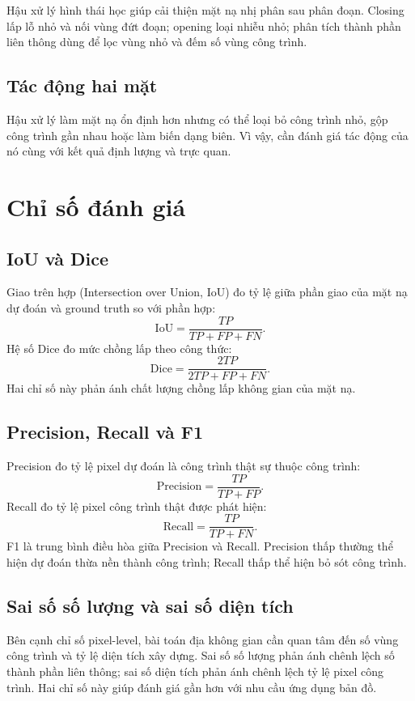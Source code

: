 \documentclass[12pt,a4paper]{report}
\begin{document}
Hậu xử lý hình thái học giúp cải thiện mặt nạ nhị phân sau phân đoạn. Closing lấp lỗ nhỏ và nối vùng đứt đoạn; opening loại nhiễu nhỏ; phân tích thành phần liên thông dùng để lọc vùng nhỏ và đếm số vùng công trình.

\subsection{Tác động hai mặt}

Hậu xử lý làm mặt nạ ổn định hơn nhưng có thể loại bỏ công trình nhỏ, gộp công trình gần nhau hoặc làm biến dạng biên. Vì vậy, cần đánh giá tác động của nó cùng với kết quả định lượng và trực quan.

\section{Chỉ số đánh giá}

\subsection{IoU và Dice}

Giao trên hợp (Intersection over Union, IoU) đo tỷ lệ giữa phần giao của mặt nạ dự đoán và ground truth so với phần hợp:
\[
\mathrm{IoU} = \frac{TP}{TP + FP + FN}.
\]
Hệ số Dice đo mức chồng lấp theo công thức:
\[
\mathrm{Dice} = \frac{2TP}{2TP + FP + FN}.
\]
Hai chỉ số này phản ánh chất lượng chồng lấp không gian của mặt nạ.

\subsection{Precision, Recall và F1}

Precision đo tỷ lệ pixel dự đoán là công trình thật sự thuộc công trình:
\[
\mathrm{Precision} = \frac{TP}{TP + FP}.
\]
Recall đo tỷ lệ pixel công trình thật được phát hiện:
\[
\mathrm{Recall} = \frac{TP}{TP + FN}.
\]
F1 là trung bình điều hòa giữa Precision và Recall. Precision thấp thường thể hiện dự đoán thừa nền thành công trình; Recall thấp thể hiện bỏ sót công trình.

\subsection{Sai số số lượng và sai số diện tích}

Bên cạnh chỉ số pixel-level, bài toán địa không gian cần quan tâm đến số vùng công trình và tỷ lệ diện tích xây dựng. Sai số số lượng phản ánh chênh lệch số thành phần liên thông; sai số diện tích phản ánh chênh lệch tỷ lệ pixel công trình. Hai chỉ số này giúp đánh giá gần hơn với nhu cầu ứng dụng bản đồ.
\end{document}
